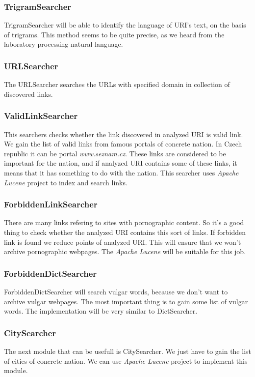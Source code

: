 \documentclass[11pt,a4paper]{article}
\begin{document}
\subsubsection*{TrigramSearcher}
TrigramSearcher will be able to identify the language of URI's text, on the basis of trigrams. This method seems to be quite precise, as we heard from the laboratory processing natural language.

\subsubsection*{URLSearcher}
The URLSearcher searches the URLs with specified domain in collection of discovered links.

\subsubsection*{ValidLinkSearcher}
This searchers checks whether the link discovered in analyzed URI is valid link. We gain the list of valid links from famous portals of concrete nation. In Czech republic it can be portal \emph{www.seznam.cz}. These links are considered to be important for the nation, and if analyzed URI contains some of these links, it means that it has something to do with the nation. This searcher uses \emph{Apache Lucene} project to index and search links.

\subsubsection*{ForbiddenLinkSearcher}
There are many links refering to sites with pornographic content. So it's a good thing to check whether the analyzed URI contains this sort of links. If forbidden link is found
we reduce points of analyzed URI. This will ensure that we won't archive pornographic webpages. The \emph{Apache Lucene} will be suitable for this job. 

\subsubsection*{ForbiddenDictSearcher}
ForbiddenDictSearcher will search vulgar words, because we don't want to archive vulgar webpages. The most important thing is to gain some list of vulgar words. The implementation will be very similar to DictSearcher.

\subsubsection*{CitySearcher}
The next module that can be usefull is CitySearcher. We just have to gain the list of cities of concrete nation. We can use \emph{Apache Lucene} project to implement this module.
\end{document}
